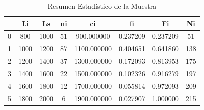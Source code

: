 \begin{table}[h]
\centering
\caption{Resumen Estadístico de la Muestra}
\label{tab:df_tabla_frecuencias}
\begin{tabular}{cccccccc}
\toprule
 & Li & Ls & ni & ci & fi & Fi & Ni \\
\midrule
0 & 800 & 1000 & 51 & 900.000000 & 0.237209 & 0.237209 & 51 \\
1 & 1000 & 1200 & 87 & 1100.000000 & 0.404651 & 0.641860 & 138 \\
2 & 1200 & 1400 & 37 & 1300.000000 & 0.172093 & 0.813953 & 175 \\
3 & 1400 & 1600 & 22 & 1500.000000 & 0.102326 & 0.916279 & 197 \\
4 & 1600 & 1800 & 12 & 1700.000000 & 0.055814 & 0.972093 & 209 \\
5 & 1800 & 2000 & 6 & 1900.000000 & 0.027907 & 1.000000 & 215 \\
\bottomrule
\end{tabular}
\end{table}
